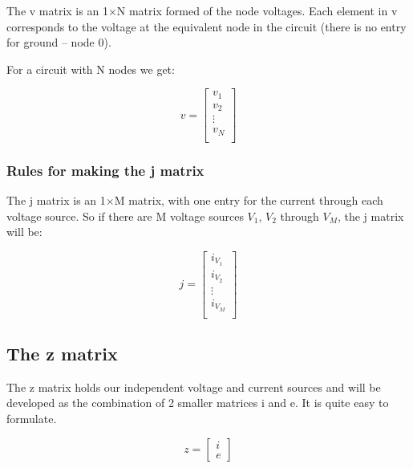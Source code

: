 \documentclass[10pt]{report}
\begin{document}
The v matrix is an 1$\times$N matrix formed of the node voltages.
Each element in v corresponds to the voltage at the equivalent node in
the circuit (there is no entry for ground -- node 0).

\addvspace{12pt}

For a circuit with N nodes we get:

\begin{equation}
v =
\begin{bmatrix}
v_{1}\\
v_{2}\\
\vdots\\
v_{N}\\
\end{bmatrix}
\end{equation}

\subsubsection{Rules for making the j matrix}

The j matrix is an 1$\times$M matrix, with one entry for the current
through each voltage source.  So if there are M voltage sources
$V_{1}$, $V_{2}$ through $V_{M}$, the j matrix will be:

\begin{equation}
j =
\begin{bmatrix}
i_{V_{1}}\\
i_{V_{2}}\\
\vdots\\
i_{V_{M}}\\
\end{bmatrix}
\end{equation}

\subsection{The z matrix}

The z matrix holds our independent voltage and current sources and
will be developed as the combination of 2 smaller matrices i and e.
It is quite easy to formulate.

\begin{equation}
z =
\begin{bmatrix}
i\\
e
\end{bmatrix}
\end{equation}
\end{document}
